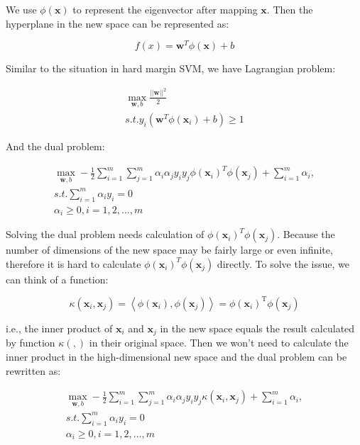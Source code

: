 \documentclass{article}
\begin{document}
We use $\phi(\boldsymbol{x})$ to represent the eigenvector after mapping $\boldsymbol{x}$. Then the hyperplane in the new space can be represented as:

\begin{equation} \label{eq1}
f(x) = \boldsymbol{w}^T\phi(\boldsymbol{x}) + b
\end{equation}

Similar to the situation in hard margin SVM, we have Lagrangian problem:

\begin{gather*}
\max_{\boldsymbol{w}, b} \frac{||\boldsymbol{w}||^2}{2} \nonumber \\
s.t. y_i(\boldsymbol{w}^T\phi(\boldsymbol{x}_i) + b) \geq 1
\end{gather*}

And the dual problem:

\begin{gather*}
\max_{\boldsymbol{w}, b} -\frac{1}{2}\sum_{i=1}^{m}{\sum_{j=1}^{m}{\alpha_i \alpha_j y_i y_j \phi(\boldsymbol{x}_i)^T \phi(\boldsymbol{x}_j)}} + \sum_{i=1}^{m}{\alpha_i},  \\
s.t. \sum_{i=1}^{m}{\alpha_i y_i} = 0 \\
\alpha_i \geq 0, i=1,2,...,m
\end{gather*}

Solving the dual problem needs calculation of $\phi(\boldsymbol{x}_i)^T \phi(\boldsymbol{x}_j)$. Because the number of dimensions of the new space may be fairly large or even infinite, therefore it is hard to calculate $\phi(\boldsymbol{x}_i)^T \phi(\boldsymbol{x}_j)$ directly. To solve the issue, we can think of a function:

\begin{equation}
\kappa\left(\boldsymbol{x}_i, \boldsymbol{x}_j\right)=\left\langle\phi\left(\boldsymbol{x}_i\right), \phi\left(\boldsymbol{x}_j\right)\right\rangle=\phi\left(\boldsymbol{x}_i\right)^{\mathrm{T}} \phi\left(\boldsymbol{x}_j\right)
\end{equation}

i.e., the inner product of $\boldsymbol{x}_i$ and $\boldsymbol{x}_j$ in the new space equals the result calculated by function $\kappa(,)$ in their original space. Then we won't need to calculate the inner product in the high-dimensional new space and the dual problem can be rewritten as:

\begin{gather*}
\max_{\boldsymbol{w}, b} -\frac{1}{2}\sum_{i=1}^{m}{\sum_{j=1}^{m}{\alpha_i \alpha_j y_i y_j \kappa(\boldsymbol{x}_i, \boldsymbol{x}_j)}} + \sum_{i=1}^{m}{\alpha_i},  \\
s.t. \sum_{i=1}^{m}{\alpha_i y_i} = 0 \\
\alpha_i \geq 0, i=1,2,...,m
\end{gather*}
\end{document}

